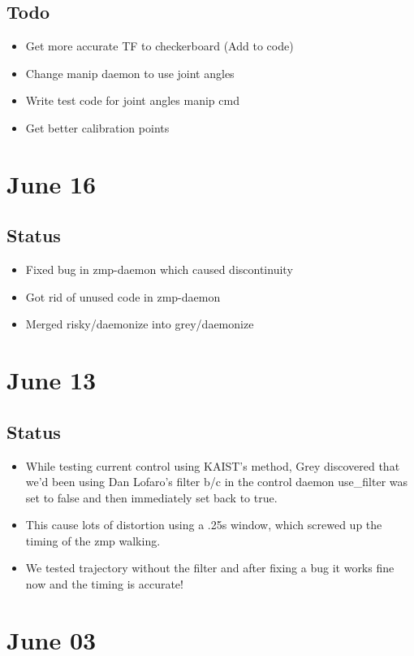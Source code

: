 \documentclass[letterpaper, 10 pt]{report}
\begin{document}
\subsection*{Todo}
\begin{itemize}
\item Get more accurate TF to checkerboard (Add to code)
\item Change manip daemon to use joint angles
\item Write test code for joint angles manip cmd
\item Get better calibration points
\end{itemize}

\section*{June 16}
\subsection*{Status}
\begin{itemize}
\item Fixed bug in zmp-daemon which caused discontinuity
\item Got rid of unused code in zmp-daemon
\item Merged risky/daemonize into grey/daemonize
\end{itemize}

\section*{June 13}
\subsection*{Status}
\begin{itemize}
\item While testing current control using KAIST's method, Grey discovered that we'd been using Dan Lofaro's filter b/c in the control daemon use\_filter was set to false and then immediately set back to true.
\item This cause lots of distortion using a .25s window, which screwed up the timing of the zmp walking.
\item We tested trajectory without the filter and after fixing a bug it works fine now and the timing is accurate!
\end{itemize}

\section*{June 03}
\end{document}
